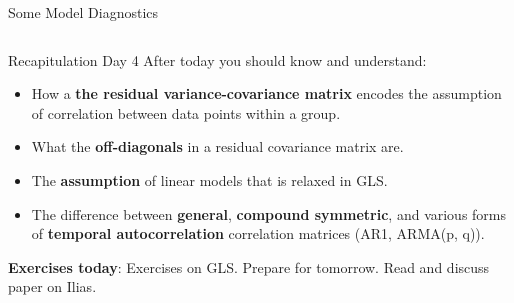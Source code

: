 \documentclass{beamer}
\newenvironment{VerbatimIN}
 {\VerbatimEnvironment
  \begin{tcolorbox}[
    breakable,
    colback=lightgray,
    spartan
  ]%
  \begin{Verbatim}}
 {\end{Verbatim}\end{tcolorbox}}
\begin{document}
\begin{frame}[fragile]{Some Model Diagnostics}
\begin{columns}
    \end{columns}
\end{frame}

\begin{frame}{Recapitulation Day 4}
  After today you should know and understand:
  \begin{itemize}
    \item How a \textbf{the residual variance-covariance matrix} encodes the assumption of correlation between data points within a group.
    \item What the \textbf{off-diagonals} in a residual covariance matrix are.
    \item The \textbf{assumption} of linear models that is relaxed in GLS.
    \item The difference between \textbf{general}, \textbf{compound symmetric}, and various forms of \textbf{temporal autocorrelation} correlation matrices (AR1, ARMA(p, q)).
  \end{itemize}
  \textbf{Exercises today}: Exercises on GLS. Prepare for tomorrow. Read and discuss paper on Ilias.
\end{frame}
\end{document}
